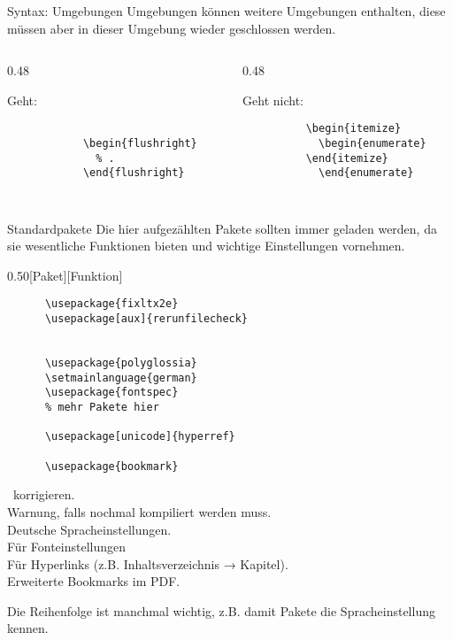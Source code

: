 \begin{frame}[fragile]{Syntax: Umgebungen}
  Umgebungen können weitere Umgebungen enthalten, diese müssen aber in dieser Umgebung wieder geschlossen werden.
  \begin{columns}[onlytextwidth, t]
    \begin{column}{0.48\textwidth}
      \begin{block}{Geht:}
        \begin{lstlisting}
          
            \begin{flushright}
              % .
            \end{flushright}
          
        \end{lstlisting}
      \end{block}
    \end{column}
    \begin{column}{0.48\textwidth}
      \begin{alertblock}{Geht nicht:}
        \begin{lstlisting}
          \begin{itemize}
            \begin{enumerate}
          \end{itemize}
            \end{enumerate}
        \end{lstlisting}
      \end{alertblock}
    \end{column}
  \end{columns}
\end{frame}

\begin{frame}[fragile]{Standardpakete}
  Die hier aufgezählten Pakete sollten immer geladen werden, da sie wesentliche Funktionen bieten und wichtige Einstellungen vornehmen.
  \vspace{-1em}
  \begin{CodeExplanation}{0.50}[Paket][Funktion]
    \begin{lstlisting}
      \usepackage{fixltx2e}
      \usepackage[aux]{rerunfilecheck}


      \usepackage{polyglossia}
      \setmainlanguage{german}
      \usepackage{fontspec}
      % mehr Pakete hier

      \usepackage[unicode]{hyperref}

      \usepackage{bookmark}
    \end{lstlisting}
  \Explanation
    \LaTeXe\ korrigieren. \\
    Warnung, falls nochmal kompiliert werden muss. \\[\baselineskip]
  Deutsche Spracheinstellungen. \\[\baselineskip]
    Für Fonteinstellungen \\[2\baselineskip]
    Für Hyperlinks (z.B. Inhaltsverzeichnis → Kapitel). \\
    Erweiterte Bookmarks im PDF.
  \end{CodeExplanation}
  Die Reihenfolge ist manchmal wichtig, z.B. damit Pakete die Spracheinstellung kennen.
\end{frame}

